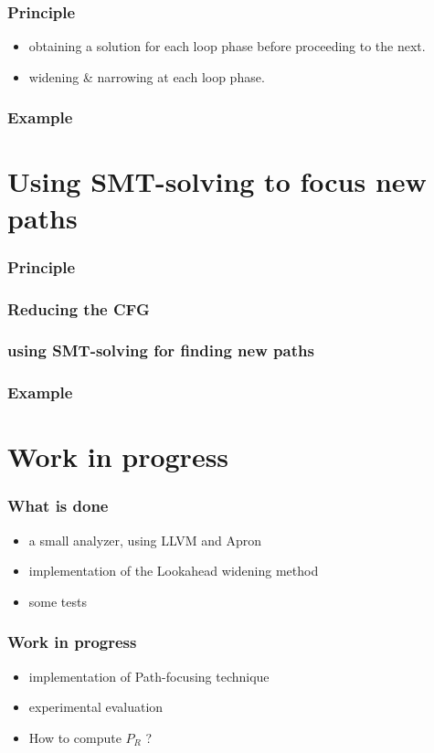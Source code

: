 \documentclass{beamer}
\begin{document}
\begin{frame}
  \frametitle{Principle}
\begin{itemize}
\item obtaining a solution for each loop phase before proceeding to the next.
\item widening \& narrowing at each loop phase.
\end{itemize}
\end{frame}

\begin{frame}
\frametitle{Example}
\end{frame}

\section[Path focusing]{Using SMT-solving to focus new paths}

\begin{frame}
  \frametitle{Principle}
\end{frame}

\begin{frame}
  \frametitle{Reducing the CFG}
\end{frame}

\begin{frame}
  \frametitle{using SMT-solving for finding new paths}
\end{frame}

\begin{frame}
  \frametitle{Example}
\end{frame}


\section[Work in progress]{Work in progress}

\begin{frame}
  \frametitle{What is done}
\begin{itemize}
\item a small analyzer, using LLVM and Apron
\item implementation of the Lookahead widening method
\item some tests
\end{itemize}
\end{frame}

\begin{frame}
  \frametitle{Work in progress}
\begin{itemize}
\item implementation of Path-focusing technique
\item experimental evaluation
\item How to compute $P_R$ ?
\end{itemize}
\end{frame}
\end{document}
